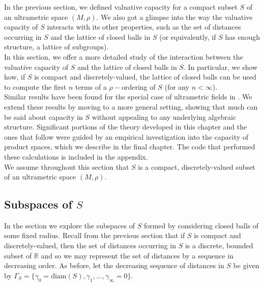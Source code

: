 
In the previous section, we defined valuative capacity for a compact subset $S$ of an ultrametric space $(M, \rho)$. We also got a glimpse into the way the valuative capacity of $S$ interacts with its other properties, such as the set of distances occurring in $S$ and the lattice of closed balls in $S$ (or equivalently, if $S$ has enough structure, a lattice of subgroups).\\

In this section, we offer a more detailed study of the interaction between the valuative capacity of $S$ and the lattice of closed balls in $S$. In particular, we  show how, if $S$ is compact and discretely-valued, the lattice of closed balls can be used to compute the first $n$ terms of a $\rho-$ordering of $S$ (for any $n < \infty$). \\

Similar results have been found for the special case of ultrametric fields in \cite{cef}. We extend these results by moving to a more general setting, showing that much can be said about capacity in $S$ without appealing to any underlying algebraic structure. Significant portions of the theory developed in this chapter and the ones that follow were guided by an empirical investigation into the capacity of product spaces, which we describe in the final chapter. The code that performed these calculations is included in the appendix.\\

We assume throughout this section that $S$ is a compact, discretely-valued subset of an ultrametric space $(M, \rho)$.\\

\subsection*{Subspaces of $S$}
In the section we explore the subspaces of $S$ formed by considering closed balls of some fixed radius.  Recall from the previous section that if $S$ is compact and discretely-valued, then the set of distances occurring in $S$ is a discrete, bounded subset of $\mathbb{R}$ and so we may represent the set of distances by a sequence in decreasing order. As before, let the decreasing sequence of distances in $S$ be given by  $\Gamma_S =\{\gamma_0=\text{diam}(S), \gamma_1,\ldots,\gamma_\infty=0\}$.\\

